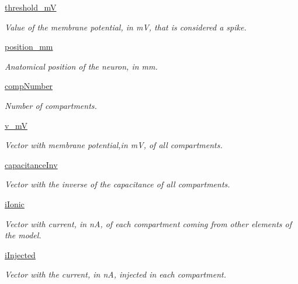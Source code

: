 \begin{DoxyCompactItemize}
\hyperlink{class_motor_unit_1_1_motor_unit_affbd0b90f1dce6a0f929775e54f8c212}{threshold\+\_\+mV}
\begin{DoxyCompactList}\small\item\em Value of the membrane potential, in mV, that is considered a spike. \end{DoxyCompactList}\item 
\hyperlink{class_motor_unit_1_1_motor_unit_a9b1938bcbaa8c89ef47e0b915ab4cd39}{position\+\_\+mm}
\begin{DoxyCompactList}\small\item\em Anatomical position of the neuron, in mm. \end{DoxyCompactList}\item 
\hyperlink{class_motor_unit_1_1_motor_unit_afe7281fb12c41102980b6b48d5a49713}{comp\+Number}
\begin{DoxyCompactList}\small\item\em Number of compartments. \end{DoxyCompactList}\item 
\hyperlink{class_motor_unit_1_1_motor_unit_aa8968f89250895ae2ae572e9106709f2}{v\+\_\+mV}
\begin{DoxyCompactList}\small\item\em Vector with membrane potential,in mV, of all compartments. \end{DoxyCompactList}\item 
\hyperlink{class_motor_unit_1_1_motor_unit_a0cf2afb5bd12374db56b9d9a5a1671e6}{capacitance\+Inv}
\begin{DoxyCompactList}\small\item\em Vector with the inverse of the capacitance of all compartments. \end{DoxyCompactList}\item 
\hyperlink{class_motor_unit_1_1_motor_unit_a0541858216e7d01582312f9a7a99d595}{i\+Ionic}
\begin{DoxyCompactList}\small\item\em Vector with current, in nA, of each compartment coming from other elements of the model. \end{DoxyCompactList}\item 
\hyperlink{class_motor_unit_1_1_motor_unit_a06045eca379d38892670a491dbac0829}{i\+Injected}
\begin{DoxyCompactList}\small\item\em Vector with the current, in nA, injected in each compartment. \end{DoxyCompactList}\item 

\end{DoxyCompactItemize}
